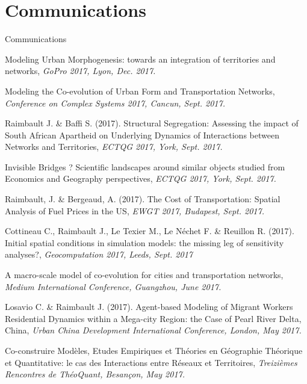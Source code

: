\section*{Communications}{Communications}



\noindent Modeling Urban Morphogenesis: towards an integration of territories and networks, \textit{GoPro 2017, Lyon, Dec. 2017.}


\bigskip


\noindent Modeling the Co-evolution of Urban Form and Transportation Networks, \textit{Conference on Complex Systems 2017, Cancun, Sept. 2017.}

\bigskip

\noindent Raimbault J. \& Baffi S. (2017). Structural Segregation: Assessing the impact of South African Apartheid on Underlying Dynamics of Interactions between Networks and Territories, \textit{ECTQG 2017, York, Sept. 2017.}


\bigskip


\noindent Invisible Bridges ? Scientific landscapes around similar objects studied from Economics and Geography perspectives, \textit{ECTQG 2017, York, Sept. 2017.}


\bigskip


\noindent Raimbault, J. \& Bergeaud, A. (2017). The Cost of Transportation: Spatial Analysis of Fuel Prices in the US, \textit{EWGT 2017, Budapest, Sept. 2017.}

\bigskip


\noindent Cottineau C., Raimbault J., Le Texier M., Le N{\'e}chet F. \& Reuillon R. (2017). Initial spatial conditions in simulation models: the missing leg of sensitivity analyses?, \textit{Geocomputation 2017, Leeds, Sept. 2017}

\bigskip


\noindent A macro-scale model of co-evolution for cities and transportation networks, \textit{Medium International Conference, Guangzhou, June 2017.}


\bigskip

\noindent Losavio C. \& Raimbault J. (2017). Agent-based Modeling of Migrant Workers Residential Dynamics within a Mega-city Region: the Case of Pearl River Delta, China, \textit{Urban China Development International Conference, London, May 2017.}


\bigskip

\noindent Co-construire Modèles, Etudes Empiriques et Théories en Géographie Théorique et Quantitative: le cas des Interactions entre Réseaux et Territoires, \textit{Treizièmes Rencontres de ThéoQuant, Besançon, May 2017.}


